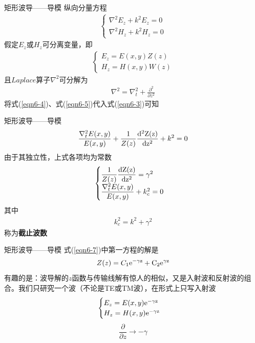 \begin{frame}{矩形波导——导模}
    纵向分量方程
    \begin{align}
        \begin{cases}
            \nabla^2E_z+k^2E_z=0 \\
            \nabla^2H_z+k^2H_z=0
        \end{cases}
        \label{eqn6-3}
    \end{align}
    假定$E_z$或$H_z$可分离变量，即
    \begin{align}
        \begin{cases}
            E_z=E(x,y)Z(z) \\
            H_z=H(x,y)W(z)
        \end{cases}
        \label{eqn6-4}
    \end{align}
    且$Laplace$算子$\nabla^2$可分解为
    \begin{align}
        \nabla^2=\nabla_t^2+\frac{\partial^2}{\partial z^2}
        \label{eqn6-5}
    \end{align}
    将式(\ref{eqn6-4})、式(\ref{eqn6-5})代入式(\ref{eqn6-3})可知
\end{frame}

\begin{frame}{矩形波导——导模}
    \begin{align}
        \frac{\nabla^2_t E(x,y)}{E(x,y)}+\frac{1}{Z(z)}\frac{\rm{d}^2 Z(z)}{\rm{d}z^2}+k^2=0
        \label{eqn6-6}
    \end{align}
    由于其独立性，上式各项均为常数
    \begin{align}
        \begin{cases}
            \dfrac{1}{Z(z)}\dfrac{\rm{d}Z(z)}{\rm{d}z^2}=\gamma^2 \\
            \dfrac{\nabla_t^2E(x,y)}{E(x,y)}+k_c^2=0
        \end{cases}
        \label{eqn6-7}
    \end{align}
    其中
    \begin{align}
        k_c^2=k^2+\gamma^2
    \end{align}
    称为\textbf{截止波数}
\end{frame}

\begin{frame}{矩形波导——导模}
    式(\ref{eqn6-7})中第一方程的解是
    \begin{align}
        Z(z)=C_1\rm{e}^{-\gamma z}+C_2\rm{e}^{\gamma z}
    \end{align}
    有趣的是：波导解的$z$函数与传输线解有惊人的相似，又是入射波和反射波的组合。我们只研究一个波（不论是TE或TM波），在形式上只写入射波
    \begin{align}
        \begin{cases}
            E_z=E(x,y)\rm{e}^{-\gamma z} \\
            H_z=H(x,y)\rm{e}^{-\gamma z}
        \end{cases}
    \end{align}
    $$\frac{\partial}{\partial z}\rightarrow -\gamma$$
\end{frame}

